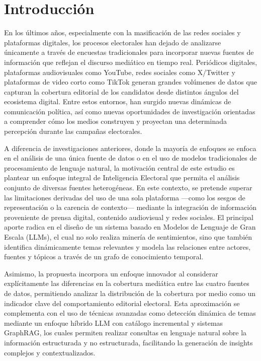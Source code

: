 
\chapter*{Introducción}

En los últimos años, especialmente con la masificación de las redes sociales y plataformas digitales, los procesos electorales han dejado de analizarse únicamente a través de encuestas tradicionales para incorporar nuevas fuentes de información que reflejan el discurso mediático en tiempo real. Periódicos digitales, plataformas audiovisuales como YouTube, redes sociales como X/Twitter y plataformas de video corto como TikTok generan grandes volúmenes de datos que capturan la cobertura editorial de los candidatos desde distintos ángulos del ecosistema digital. Entre estos entornos, han surgido nuevas dinámicas de comunicación política, así como nuevas oportunidades de investigación orientadas a comprender cómo los medios construyen y proyectan una determinada percepción durante las campañas electorales.

A diferencia de investigaciones anteriores, donde la mayoría de enfoques se enfoca en el análisis de una única fuente de datos o en el uso de modelos tradicionales de procesamiento de lenguaje natural, la motivación central de este estudio es plantear un enfoque integral de Inteligencia Electoral que permita el análisis conjunto de diversas fuentes heterogéneas. En este contexto, se pretende superar las limitaciones derivadas del uso de una sola plataforma —como los sesgos de representación o la carencia de contexto— mediante la integración de información proveniente de prensa digital, contenido audiovisual y redes sociales. El principal aporte radica en el diseño de un sistema basado en Modelos de Lenguaje de Gran Escala (LLMs), el cual no solo realiza minería de sentimientos, sino que también identifica dinámicamente temas relevantes y modela las relaciones entre actores, fuentes y tópicos a través de un grafo de conocimiento temporal.

Asimismo, la propuesta incorpora un enfoque innovador al considerar explícitamente las diferencias en la cobertura mediática entre las cuatro fuentes de datos, permitiendo analizar la distribución de la cobertura por medio como un indicador clave del comportamiento editorial electoral. Esta aproximación se complementa con el uso de técnicas avanzadas como detección dinámica de temas mediante un enfoque híbrido LLM con catálogo incremental y sistemas GraphRAG, los cuales permiten realizar consultas en lenguaje natural sobre la información estructurada y no estructurada, facilitando la generación de insights complejos y contextualizados.

